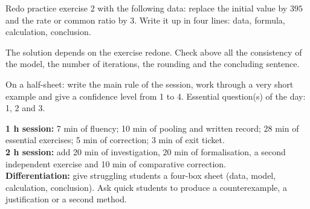 
\begin{homework}Redo practice exercise 2 with the following data: replace the initial value by $395$ and the rate or common ratio by $3$. Write it up in four lines: data, formula, calculation, conclusion.\end{homework}
\begin{solution}The solution depends on the exercise redone. Check above all the consistency of the model, the number of iterations, the rounding and the concluding sentence.\end{solution}

\begin{exitticket}[3 minutes]On a half-sheet: write the main rule of the session, work through a very short example and give a confidence level from 1 to 4. Essential question(s) of the day: 1, 2 and 3.\end{exitticket}

\ifmxteacher
\begin{method}
\textbf{1 h session:} 7 min of fluency; 10 min of pooling and written record; 28 min of essential exercises; 5 min of correction; 3 min of exit ticket.\\
\textbf{2 h session:} add 20 min of investigation, 20 min of formalisation, a second independent exercise and 10 min of comparative correction.\\
\textbf{Differentiation:} give struggling students a four-box sheet (data, model, calculation, conclusion). Ask quick students to produce a counterexample, a justification or a second method.
\end{method}
\fi
